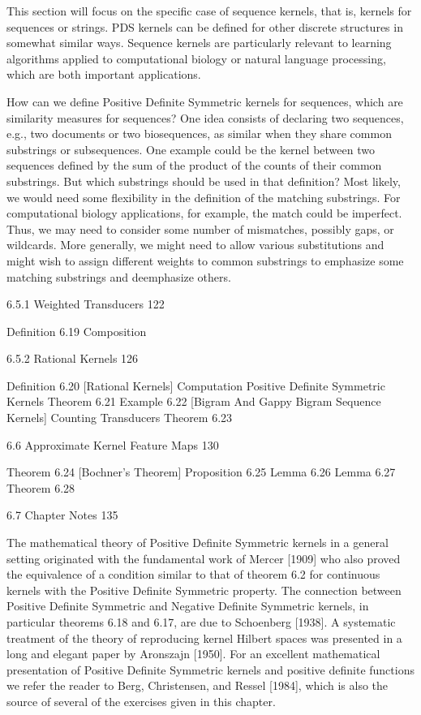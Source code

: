 This section will focus on the specific case of sequence kernels, that is, kernels for sequences or strings. PDS kernels can be defined for other discrete structures in somewhat similar ways. Sequence kernels are particularly relevant to learning algorithms applied to computational biology or natural language processing, which are both important applications.

How can we define Positive Definite Symmetric kernels for sequences, which are similarity measures for sequences? One idea consists of declaring two sequences, e.g., two documents or two biosequences, as similar when they share common substrings or subsequences. One example could be the kernel between two sequences defined by the sum of the product of the counts of their common substrings. But which substrings should be used in that definition? Most likely, we would need some flexibility in the definition of the matching substrings. For computational biology applications, for example, the match could be imperfect. Thus, we may need to consider some number of mismatches, possibly gaps, or wildcards. More generally, we might need to allow various substitutions and might wish to assign different weights to common substrings to emphasize some matching substrings and deemphasize others.

6.5.1 Weighted Transducers 122

Definition 6.19
Composition

6.5.2 Rational Kernels 126

Definition 6.20 [Rational Kernels]
Computation
Positive Definite Symmetric Kernels
Theorem 6.21
Example 6.22 [Bigram And Gappy Bigram Sequence Kernels]
Counting Transducers
Theorem 6.23

6.6 Approximate Kernel Feature Maps 130

Theorem 6.24 [Bochner's Theorem]
Proposition 6.25
Lemma 6.26
Lemma 6.27
Theorem 6.28

6.7 Chapter Notes 135

The mathematical theory of Positive Definite Symmetric kernels in a general setting originated with the fundamental work of Mercer [1909] who also proved the equivalence of a condition similar to that of theorem 6.2 for continuous kernels with the Positive Definite Symmetric property. The connection between Positive Definite Symmetric and Negative Definite Symmetric kernels, in particular theorems 6.18 and 6.17, are due to Schoenberg [1938]. A systematic treatment of the theory of reproducing kernel Hilbert spaces was presented in a long and elegant paper by Aronszajn [1950]. For an excellent mathematical presentation of Positive Definite Symmetric kernels and positive definite functions we refer the reader to Berg, Christensen, and Ressel [1984], which is also the source of several of the exercises given in this chapter.

